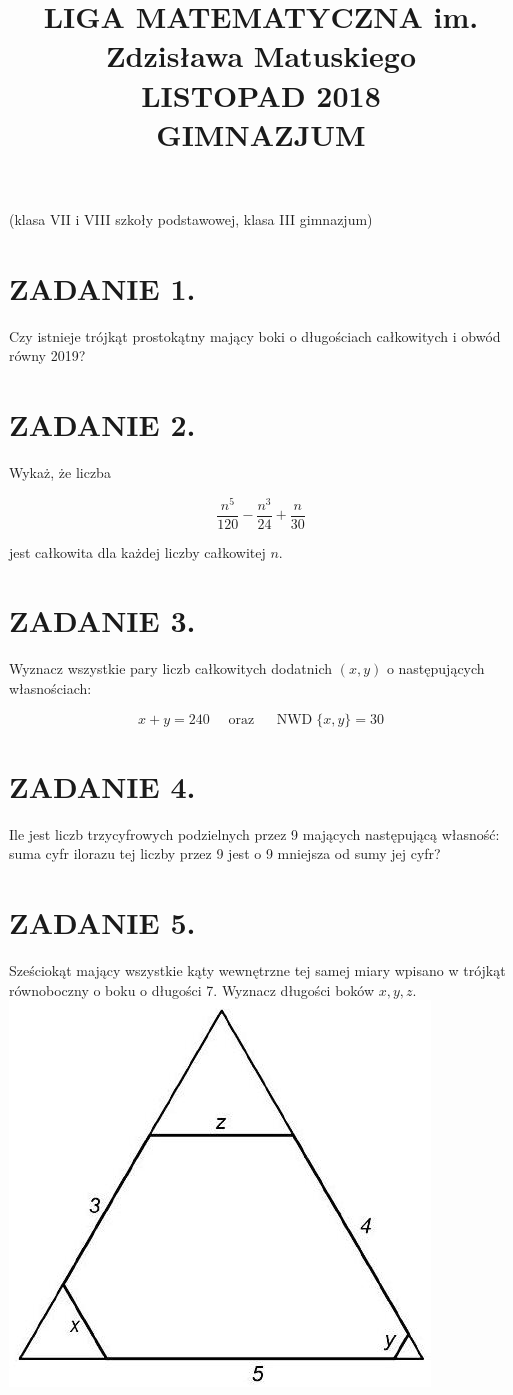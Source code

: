 \documentclass[10pt]{article}
\title{LIGA MATEMATYCZNA im. Zdzisława Matuskiego \\
 LISTOPAD 2018 \\
 GIMNAZJUM }
\author{}
\date{}
\begin{document}
\maketitle
(klasa VII i VIII szkoły podstawowej, klasa III gimnazjum)

\section*{ZADANIE 1.}
Czy istnieje trójkąt prostokątny mający boki o długościach całkowitych i obwód równy 2019?

\section*{ZADANIE 2.}
Wykaż, że liczba

\[
\frac{n^{5}}{120}-\frac{n^{3}}{24}+\frac{n}{30}
\]

jest całkowita dla każdej liczby całkowitej \(n\).

\section*{ZADANIE 3.}
Wyznacz wszystkie pary liczb całkowitych dodatnich \((x, y)\) o następujących własnościach:

\[
x+y=240 \quad \text { oraz } \quad \operatorname{NWD}\{x, y\}=30
\]

\section*{ZADANIE 4.}
Ile jest liczb trzycyfrowych podzielnych przez 9 mających następującą własność: suma cyfr ilorazu tej liczby przez 9 jest o 9 mniejsza od sumy jej cyfr?

\section*{ZADANIE 5.}
Sześciokąt mający wszystkie kąty wewnętrzne tej samej miary wpisano w trójkąt równoboczny o boku o długości 7. Wyznacz długości boków \(x, y, z\).\\
\includegraphics[max width=\textwidth, center]{2024_11_21_b9301f47f75104ae1ce5g-1}
\end{document}
